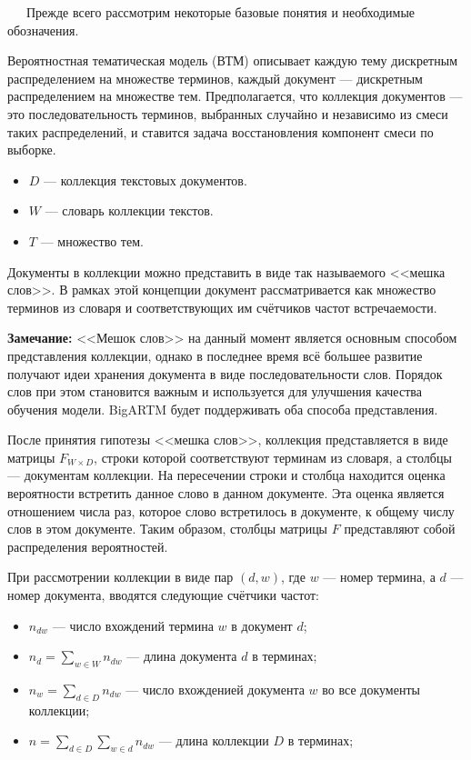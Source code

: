 
$\quad\;\:$Прежде всего рассмотрим некоторые базовые понятия и необходимые обозначения.

Вероятностная тематическая модель (ВТМ) описывает каждую тему дискретным распределением на множестве терминов, каждый документ --- дискретным распределением на множестве тем. Предполагается, что коллекция документов --- это последовательность терминов, выбранных случайно и независимо из смеси таких распределений, и ставится задача восстановления компонент смеси по выборке.

\begin{itemize}
	\item $D$ --- коллекция текстовых документов.
	\item $W$ --- словарь коллекции текстов.
	\item $T$ --- множество тем.
\end{itemize}

Документы в коллекции можно представить в виде так называемого <<мешка слов>>. В рамках этой концепции документ рассматривается как множество терминов из словаря и соответствующих им счётчиков частот встречаемости.

{\bf Замечание: } <<Мешок слов>> на данный момент является основным способом представления коллекции, однако в последнее время всё большее развитие получают идеи хранения документа в виде последовательности слов. Порядок слов при этом становится важным и используется для улучшения качества обучения модели. BigARTM будет поддерживать оба способа представления.

После принятия гипотезы <<мешка слов>>, коллекция представляется в виде матрицы $F_{W \times D}$, строки которой соответствуют терминам из словаря, а столбцы --- документам коллекции. На пересечении строки и столбца находится оценка вероятности встретить данное слово в данном документе. Эта оценка является отношением числа раз, которое слово встретилось в документе, к общему числу слов в этом документе. Таким образом, столбцы матрицы $F$ представляют собой распределения вероятностей.

При рассмотрении коллекции в виде пар $(d, w)$, где $w$ --- номер термина, а $d$ --- номер документа, вводятся следующие счётчики частот:

\begin{itemize}
	\item $n_{dw}$ --- число вхождений термина $w$ в документ $d$;
	\item $n_d = \sum_{w \in W} n_{dw}$ --- длина документа $d$ в терминах;
	\item $n_w = \sum_{d \in D} n_{dw}$ --- число вхожденией документа $w$ во все документы коллекции;
	\item $n = \sum_{d \in D}\sum_{w \in d} n_{dw}$ --- длина коллекции $D$ в терминах; 
\end{itemize}

